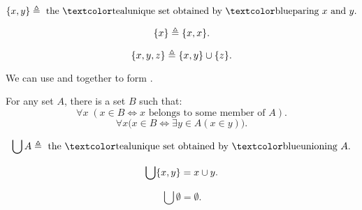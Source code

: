 \begin{frame}{}
  \begin{definition}[``$\set{x, y}$'']
    \[
      \set{x, y} \triangleq \text{ the \teal{unique} set obtained by \blue{paring} } x \text{ and } y.
    \]
  \end{definition}

  \begin{definition}[``$\set{x}$'']
    \[
      \{x\} \triangleq \{x, x\}.
    \]
  \end{definition}

  \pause
  \vspace{0.60cm}
  \begin{definition}[``$\set{x, y, z}$'']
    \[
      \{x, y, z\} \triangleq \{x, y\} \cup \{z\}.
    \]
  \end{definition}

  \pause
  \begin{center}
    We can use  and  together to form .
  \end{center}
\end{frame}

\begin{frame}{}
  \begin{axiom}
    For any set $A$, there is a set $B$ such that:
    \[
      \forall x\; (x \in B \iff x \text{ belongs to some member of } A).
    \]
    \[
      \forall x \big( x \in B \iff \exists y \in A (x \in y) \big).
    \]
  \end{axiom}

  \pause
  \begin{definition}
    \[
      \bigcup A \triangleq \text{ the \teal{unique} set obtained by \blue{unioning} } A.
    \]
  \end{definition}

  \pause
  \begin{theorem}
    \[
      \bigcup \{x, y\} = x \cup y.
    \]
  \end{theorem}

  \pause
  \begin{theorem}
    \[
      \bigcup \emptyset = \emptyset.
    \]
  \end{theorem}
\end{frame}

